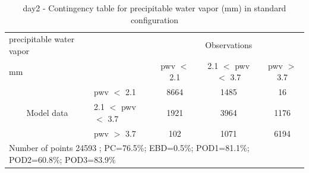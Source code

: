 \begin{table}[p!]
\begin{center}
\begin{tabular}{llccc}
\hline
{precipitable water vapor}                                       &                                                    & \multicolumn{3}{c}{Observations}                 \\
{mm}                                       &                             & pwv $<$ 2.1   & 2.1 $<$ pwv $<$ 3.7 & pwv $>$ 3.7 \\
\hline
\multicolumn{1}{c}{\multirow{3}{*}{Model data}}  & pwv $<$ 2.1             & 8664                & 1485                       & 16              \\
                                                 & 2.1  $<$ pwv $<$ 3.7 & 1921                & 3964                       & 1176              \\
                                                 & pwv $>$ 3.7             & 102                & 1071                       & 6194              \\
\hline
\multicolumn{5}{l}{ Number of points        24593 ; PC=76.5\%; EBD=0.5\%; POD1=81.1\%; POD2=60.8\%; POD3=83.9\%}                 \\
\end{tabular}
\end{center}
\caption{day2 - Contingency table for  precipitable water vapor (mm) in standard configuration  }
\label{tab:contingencypwvBEF:day2}
\end{table}
